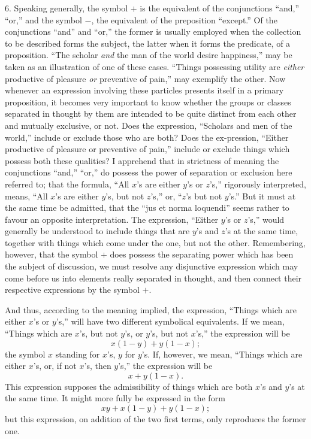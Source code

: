 \documentclass[oneside]{book}
\begin{document}
6. Speaking generally, the symbol $+$ is the equivalent of the
conjunctions ``and,'' ``or,'' and the symbol $-$, the equivalent of
the preposition ``except.'' Of the conjunctions ``and'' and ``or,''
the former is usually employed when the collection to be described
forms the subject, the latter when it forms the predicate,
of a proposition. ``The scholar \textit{and} the man of the world desire
happiness,'' may be taken as an illustration of one of these
cases. ``Things possessing utility are \textit{either} productive of pleasure
\textit{or} preventive of pain,'' may exemplify the other. Now
whenever an expression involving these particles presents itself
in a primary proposition, it becomes very important to know
whether the groups or classes separated in thought by them are
intended to be quite distinct from each other and mutually exclusive,
or not. Does the expression, ``Scholars and men of the
world,'' include or exclude those who are both? Does the ex-pression,
``Either productive of pleasure or preventive of pain,''
include or exclude things which possess both these qualities? I
apprehend that in strictness of meaning the conjunctions ``and,''
``or,'' do possess the power of separation or exclusion here referred
to; that the formula, ``All $x$'s are either $y$'s or $z$'s,''
rigorously interpreted, means, ``All $x$'s are either $y$'s, but not $z$'s,''
or, ``$z$'s but not $y$'s.'' But it must at the same time be admitted,
that the ``jus et norma loquendi'' seems rather to favour an opposite
interpretation. The expression, ``Either $y$'s or $z$'s,'' would
generally be understood to include things that are $y$'s and $z$'s at
the same time, together with things which come under the one,
but not the other. Remembering, however, that the symbol $+$
does possess the separating power which has been the subject of
discussion, we must resolve any disjunctive expression which may
come before us into elements really separated in thought, and
then connect their respective expressions by the symbol $+$.

And thus, according to the meaning implied, the expression,
``Things which are either $x$'s or $y$'s,'' will have two different symbolical
equivalents. If we mean, ``Things which are $x$'s, but
not $y$'s, or $y$'s, but not $x$'s,'' the expression will be
\[ x (1 - y) + y ( 1 - x); \]
the symbol $x$ standing for $x$'s, $y$ for $y$'s. If, however, we mean,
``Things which are either $x$'s, or, if not $x$'s, then $y$'s,'' the expression
will be
\[ x + y(1 - x). \]
This expression supposes the admissibility of things which are
both $x$'s and $y$'s at the same time. It might more fully be expressed
in the form
\[ xy + x (1 - y) + y ( 1 - x); \]
but this expression, on addition of the two first terms, only reproduces
the former one.
\end{document}
